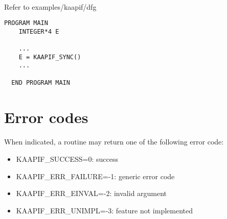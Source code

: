 \documentclass[a4paper, 11pt]{article}
\begin{document}
\paragraph{}
Refer to examples/kaapif/dfg\\
\begin{small}
\begin{lstlisting}[frame=tb]
  PROGRAM MAIN
    INTEGER*4 E

    ...
    E = KAAPIF_SYNC()
    ...

  END PROGRAM MAIN
\end{lstlisting}
\end{small}


\newpage
\section{Error codes}
\paragraph{}
When indicated, a routine may return one of the following error code:
\begin{itemize}
\item KAAPIF\_SUCCESS=0: success
\item KAAPIF\_ERR\_FAILURE=-1: generic error code
\item KAAPIF\_ERR\_EINVAL=-2: invalid argument
\item KAAPIF\_ERR\_UNIMPL=-3: feature not implemented
\end{itemize}
\end{document}
